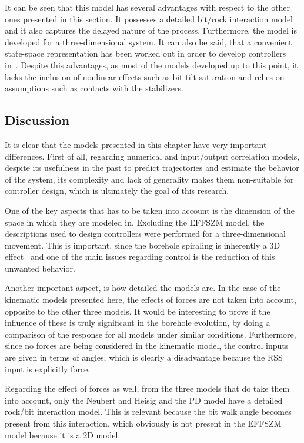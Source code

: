 It can be seen that this model has several advantages with respect to the other ones presented in this section. It possesses a detailed bit/rock interaction model and it also captures the delayed nature of the process. Furthermore, the model is developed for a three-dimensional system. It can also be said, that a convenient state-space representation has been worked out in order to develop controllers in~\cite{Monsieurs2015}. Despite this advantages, as most of the models developed up to this point, it lacks the inclusion of nonlinear effects such as bit-tilt saturation and relies on assumptions such as contacts with the stabilizers. 

\subsection{Discussion}

It is clear that the models presented in this chapter have very important differences. First of all, regarding numerical and input/output correlation models, despite its usefulness in the past to predict trajectories and estimate the behavior of the system, its complexity and lack of generality makes them non-suitable for controller design, which is ultimately the goal of this research. 

One of the key aspects that has to be taken into account is the dimension of the space in which they are modeled in. Excluding the EFFSZM model, the descriptions used to design controllers were performed for a three-dimensional movement. This is important, since the borehole spiraling is inherently a 3D effect~\cite{Marck2015} and one of the main issues regarding control is the reduction of this unwanted behavior.

Another important aspect, is how detailed the models are. In the case of the kinematic models presented here, the effects of forces are not taken into account, opposite to the other three models. It would be interesting to prove if the influence of these is truly significant in the borehole evolution, by doing a comparison of the response for all models under similar conditions. Furthermore, since no forces are being considered in the kinematic model, the control inputs are given in terms of angles, which is clearly a disadvantage because the RSS input is explicitly force.

Regarding the effect of forces as well, from the three models that do take them into account, only the Neubert and Heisig and the PD model have a detailed rock/bit interaction model. This is relevant because the bit walk angle becomes present from this interaction, which obviously is not present in the EFFSZM model because it is a 2D model.

